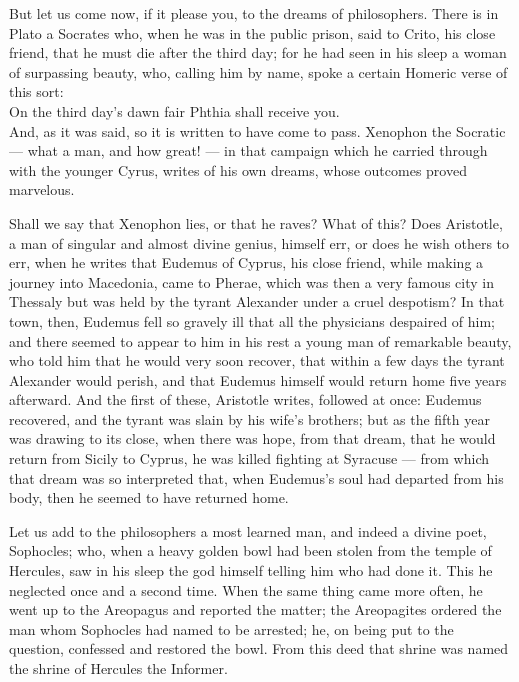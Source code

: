  But let us come now, if it please you, to the dreams of philosophers. There is in Plato a Socrates who, when he was in the public prison, said to Crito, his close friend, that he must die after the third day; for he had seen in his sleep a woman of surpassing beauty, who, calling him by name, spoke a certain Homeric verse of this sort: \\
On the third day's dawn fair Phthia shall receive you. \\
And, as it was said, so it is written to have come to pass. Xenophon the Socratic — what a man, and how great! — in that campaign which he carried through with the younger Cyrus, writes of his own dreams, whose outcomes proved marvelous.

 Shall we say that Xenophon lies, or that he raves? What of this? Does Aristotle, a man of singular and almost divine genius, himself err, or does he wish others to err, when he writes that Eudemus of Cyprus, his close friend, while making a journey into Macedonia, came to Pherae, which was then a very famous city in Thessaly but was held by the tyrant Alexander under a cruel despotism? In that town, then, Eudemus fell so gravely ill that all the physicians despaired of him; and there seemed to appear to him in his rest a young man of remarkable beauty, who told him that he would very soon recover, that within a few days the tyrant Alexander would perish, and that Eudemus himself would return home five years afterward. And the first of these, Aristotle writes, followed at once: Eudemus recovered, and the tyrant was slain by his wife's brothers; but as the fifth year was drawing to its close, when there was hope, from that dream, that he would return from Sicily to Cyprus, he was killed fighting at Syracuse — from which that dream was so interpreted that, when Eudemus's soul had departed from his body, then he seemed to have returned home.

 Let us add to the philosophers a most learned man, and indeed a divine poet, Sophocles; who, when a heavy golden bowl had been stolen from the temple of Hercules, saw in his sleep the god himself telling him who had done it. This he neglected once and a second time. When the same thing came more often, he went up to the Areopagus and reported the matter; the Areopagites ordered the man whom Sophocles had named to be arrested; he, on being put to the question, confessed and restored the bowl. From this deed that shrine was named the shrine of Hercules the Informer.

